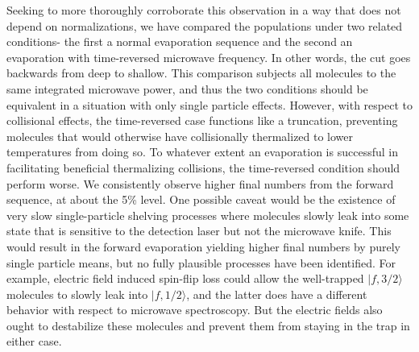 \documentclass[%
 reprint,
 amsmath,amssymb,
 aps,
pra,
]{revtex4-1}
\begin{document}
Seeking to more thoroughly corroborate this observation in a way that does not depend on normalizations, we have compared the populations under two related conditions- the first a normal evaporation sequence and the second an evaporation with time-reversed microwave frequency. 
In other words, the cut goes backwards from deep to shallow. 
This comparison subjects all molecules to the same integrated microwave power, and thus the two conditions should be equivalent in a situation with only single particle effects.
However, with respect to collisional effects, the time-reversed case functions like a truncation, preventing molecules that would otherwise have collisionally thermalized to lower temperatures from doing so.
To whatever extent an evaporation is successful in facilitating beneficial thermalizing collisions, the time-reversed condition should perform worse.
We consistently observe higher final numbers from the forward sequence, at about the 5\% level.
One possible caveat would be the existence of very slow single-particle shelving processes where molecules slowly leak into some state that is sensitive to the detection laser but not the microwave knife.
This would result in the forward evaporation yielding higher final numbers by purely single particle means, but no fully plausible processes have been identified.
For example, electric field induced spin-flip loss could allow the well-trapped $|f,3/2\rangle$ molecules to slowly leak into $|f,1/2\rangle$, and the latter does have a different behavior with respect to microwave spectroscopy. 
But the electric fields also ought to destabilize these molecules and prevent them from staying in the trap in either case.
\end{document}
